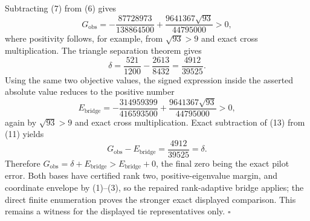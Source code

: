 Subtracting (7) from (6) gives
\[
G_{\mathrm{obs}}
=-\frac{87728973}{138864500}
+\frac{9641367\sqrt{93}}{44795000}>0,
\tag{11}
\]
where positivity follows, for example, from \(\sqrt{93}>9\) and exact cross multiplication.  The triangle separation theorem gives
\[
\delta=\frac{521}{1200}-\frac{2613}{8432}
=\frac{4912}{39525}.
\tag{12}
\]
Using the same two objective values, the signed expression inside the asserted absolute value reduces to the positive number
\[
E_{\mathrm{bridge}}
=-\frac{314959399}{416593500}
+\frac{9641367\sqrt{93}}{44795000}>0,
\tag{13}
\]
again by \(\sqrt{93}>9\) and exact cross multiplication.  Exact subtraction of (13) from (11) yields
\[
G_{\mathrm{obs}}-E_{\mathrm{bridge}}
=\frac{4912}{39525}=\delta.
\tag{14}
\]
Therefore \(G_{\mathrm{obs}}=\delta+E_{\mathrm{bridge}}>E_{\mathrm{bridge}}+0\), the final zero being the exact pilot error.  Both bases have certified rank two, positive-eigenvalue margin, and coordinate envelope by (1)--(3), so the repaired rank-adaptive bridge applies; the direct finite enumeration proves the stronger exact displayed comparison.  This remains a witness for the displayed tie representatives only. \(\square\)